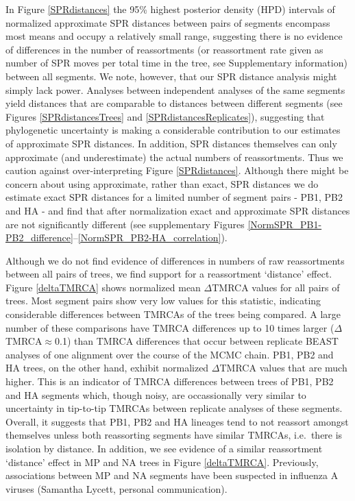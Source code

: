 \documentclass[11pt,oneside,letterpaper]{article}
\begin{document}
In Figure \ref{SPRdistances} the 95\% highest posterior density (HPD) intervals of normalized approximate SPR distances between pairs of segments encompass most means and occupy a relatively small range, suggesting there is no evidence of differences in the number of reassortments (or reassortment rate given as number of SPR moves per total time in the tree, see Supplementary information) between all segments.
We note, however, that our SPR distance analysis might simply lack power.
Analyses between independent analyses of the same segments yield distances that are comparable to distances between different segments (see Figures \ref{SPRdistancesTrees} and \ref{SPRdistancesReplicates}), suggesting that phylogenetic uncertainty is making a considerable contribution to our estimates of approximate SPR distances.
In addition, SPR distances themselves can only approximate (and underestimate) the actual numbers of reassortments.
Thus we caution against over-interpreting Figure \ref{SPRdistances}.
Although there might be concern about using approximate, rather than exact, SPR distances we do estimate exact SPR distances for a limited number of segment pairs - PB1, PB2 and HA - and find that after normalization exact and approximate SPR distances are not significantly different (see supplementary Figures \ref{NormSPR_PB1-PB2_difference}--\ref{NormSPR_PB2-HA_correlation}). 

Although we do not find evidence of differences in numbers of raw reassortments between all pairs of trees, we find support for a reassortment `distance' effect.
Figure \ref{deltaTMRCA} shows normalized mean $\Delta$TMRCA values for all pairs of trees.
Most segment pairs show very low values for this statistic, indicating considerable differences between TMRCAs of the trees being compared.
A large number of these comparisons have TMRCA differences up to 10 times larger ($\Delta$TMRCA$\approx$0.1) than TMRCA differences that occur between replicate BEAST analyses of one alignment over the course of the MCMC chain.
PB1, PB2 and HA trees, on the other hand, exhibit normalized $\Delta$TMRCA values that are much higher.
This is an indicator of TMRCA differences between trees of PB1, PB2 and HA segments which, though noisy, are occassionally very similar to uncertainty in tip-to-tip TMRCAs between replicate analyses of these segments.
Overall, it suggests that PB1, PB2 and HA lineages tend to not reassort amongst themselves unless both reassorting segments have similar TMRCAs, i.e.\ there is isolation by distance.
In addition, we see evidence of a similar reassortment `distance' effect in MP and NA trees in Figure \ref{deltaTMRCA}.
Previously, associations between MP and NA segments have been suspected in influenza A viruses (Samantha Lycett, personal communication).
\end{document}

